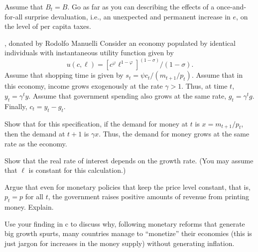  Assume that $B_t = B$.  Go as far as you can describing the
effects of a once-and-for-all surprise devaluation, i.e., an unexpected and
permanent increase in $e$, on the level of per capita taxes.

\newpage
\medskip


 , donated
by Rodolfo Manuelli
\medskip\noindent
Consider an economy populated by identical individuals with instantaneous
utility function given  by
$$ u(c,\ell) = [c^\varphi \ell^{1-\varphi}]^{(1-\sigma)}/(1-\sigma).  $$
Assume that shopping time is given by  $s_t = \psi c_t/(m_{t+1}/p_t)$.
Assume that in this economy, income grows exogenously at the rate $\gamma > 1$.
Thus, at time $t$, $y_t = \gamma^t y$.  Assume that government spending
also grows at the same rate, %
$g_t = \gamma^t g$.
Finally, $c_t = y_t - g_t$.
\medskip


 Show that for this specification, if the demand for money at
$t$ is $x = m_{t+1}/p_t$, then the demand at $t+1$ is $\gamma x$.  Thus,
the demand for money grows at the same rate as the economy.
\medskip


 Show that the real rate of interest depends on the growth rate.
(You may assume that $\ell$ is constant for this calculation.)
\medskip


 Argue that even for monetary policies that keep the price
level constant, that is, $p_t = p$ for all $t$, the government raises
positive amounts of revenue from printing money. Explain.

\medskip


 Use your finding in c to discuss why, following monetary
reforms that generate big growth spurts, many countries manage to
``monetize'' their economies (this is just jargon for increases in
the money supply) without generating inflation.
